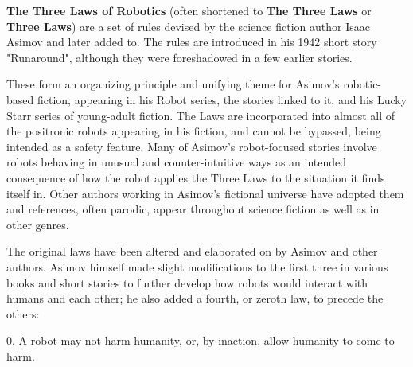 

\bigskip

\bigskip

\bigskip


\bigskip

\bigskip

\bigskip

\bigskip
\noindent\textbf{The Three Laws of Robotics} (often shortened to \textbf{The
Three Laws} or \textbf{Three Laws}) are a set of rules devised by the science
fiction author Isaac Asimov and later added to. The rules are introduced in
his 1942 short story "Runaround", although they were foreshadowed in a few
earlier stories.

These form an organizing principle and unifying theme for Asimov's robotic-
based fiction, appearing in his Robot series, the stories linked to it, and
his Lucky Starr series of young-adult fiction. The Laws are incorporated into
almost all of the positronic robots appearing in his fiction, and cannot be
bypassed, being intended as a safety feature. Many of Asimov's robot-focused
stories involve robots behaving in unusual and counter-intuitive ways as an
intended consequence of how the robot applies the Three Laws to the situation
it finds itself in. Other authors working in Asimov's fictional universe have
adopted them and references, often parodic, appear throughout science fiction
as well as in other genres.

The original laws have been altered and elaborated on by Asimov and other
authors. Asimov himself made slight modifications to the first three in
various books and short stories to further develop how robots would interact
with humans and each other; he also added a fourth, or zeroth law, to precede
the others:

    0. A robot may not harm humanity, or, by inaction, allow humanity to come
to harm. 

